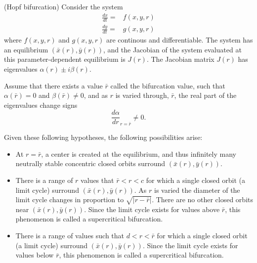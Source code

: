 \begin{theorem}(Hopf bifurcation)
Consider the system
\begin{align*}
\frac{dx}{dt}=&f(x,y,r)\\
\frac{dy}{dt}=&g(x,y,r)
\end{align*}
where $f(x,y,r)$ and $g(x,y,r)$ are continous and differentiable. The system has an equilibrium $(\bar x(r), \bar y(r))$, and the Jacobian of the system evaluated at this parameter-dependent equilibrium is $J(r)$. The Jacobian matrix $J(r)$ has eigenvalues $\alpha(r)\pm i \beta (r)$.

Assume that there exists a value $\bar r$ called the bifurcation value, such that $\alpha (\bar r)=0$ and $\beta (\bar r)\not =0$, and as $r$ is varied through, $\bar r$, the real part of the eigenvalues change signs $$\frac{d \alpha}{d r}_{r=\bar r}\not =0.$$

Given these following hypotheses, the following possibilities arise:
\begin{itemize}
\item At $r=\bar r$, a center is created at the equilibrium, and thus infinitely many neutrally stable concentric closed orbits surround $(\bar x(r), \bar y(r))$.
\item There is a range of $r$ values that $\bar r <r<c$ for which a single closed orbit (a limit cycle) surround  $(\bar x(r), \bar y(r))$. As $r$ is varied the diameter of the limit cycle changes in proportion to $\sqrt{|r-\bar r|}$. There are no other closed orbits near  $(\bar x(r), \bar y(r))$. Since the limit cycle exists for values above $\bar r$, this phenomenon is called a supercritical bifurcation.
\item There is a range of values such that $d<r<\bar r$ for which a single closed orbit (a limit cycle) surround  $(\bar x(r), \bar y(r))$. Since the limit cycle exists for values below $\bar r$, this phenomenon is called a supercritical bifurcation.
\end{itemize}
\end{theorem}







